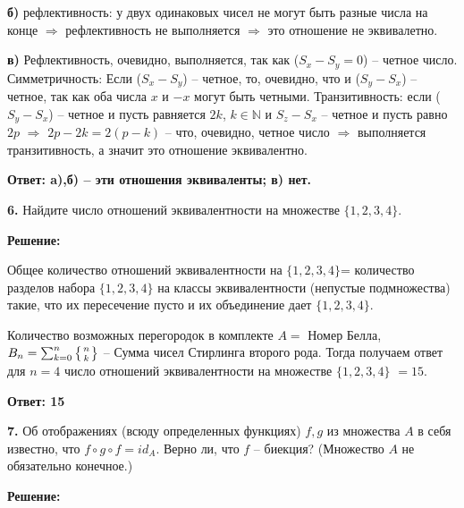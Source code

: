 \documentclass[a4paper,12pt]{article} %
\begin{document}
{\bf б)} рефлективность: у двух одинаковых чисел не могут быть разные числа на конце $\Rightarrow$ рефлективность не выполняется $\Rightarrow$ это отношение не эквивалетно.

{\bf в)} Рефлективность, очевидно, выполняется, так как ($S_x - S_y = 0$) -- четное число. Симметричность: Если ($S_x - S_y $) -- четное, то, очевидно, что и ($S_y - S_x$) -- четное, так как оба числа $x$ и $-x$ могут быть четными. Транзитивность: если ($S_y - S_x$) -- четное и пусть равняется $2k$, $k \in \mathbb{N} $ и $S_z - S_x $ -- четное и пусть равно $2p$ $\Rightarrow$ $2p-2k = 2(p-k)$ -- что, очевидно, четное число $\Rightarrow$ выполняется транзитивность, а значит это отношение эквивалентно. 

\begin{flushright}
\begin{large}
\textbf {Ответ: {\bf a),б)} -- эти отношения эквиваленты; {\bf в)} нет.}
\end{large}
\end{flushright}

{\bf 6.}  Найдите число отношений эквивалентности на множестве $\{ 1,2,3,4\}.$
\begin{center}
\bfseries
{\Large Решение: }
\end{center}

Общее количество отношений эквивалентности на $\{ 1 , 2 , 3 , 4 \} $= количество разделов набора $\{ 1 , 2 , 3 , 4 \}$ на классы эквивалентности (непустые подмножества) такие, что их пересечение пусто и их объединение дает $\{1,2,3,4\}$. 

Количество возможных перегородок в комплекте $A = $ Номер Белла, $B_n = \sum_{k = 0}^n \left \{{n \atop k} \right \}$ -- Сумма чисел Стирлинга второго рода.
Тогда получаем ответ для $n = 4$ число отношений эквивалентности на множестве $\{1,2,3,4\}$  $= 15$.



\begin{flushright}
\begin{large}
\textbf {Ответ: 15}
\end{large}
\end{flushright}

{\bf 7.} Об отображениях (всюду определенных функциях) $f, g$ из множества
$A$ в себя известно, что $f \circ g \circ f = id_A$. Верно ли, что $f$ -- биекция?
(Множество $A$ не обязательно конечное.)
\begin{center}
\bfseries
{\Large Решение: }
\end{center}
\end{document}
